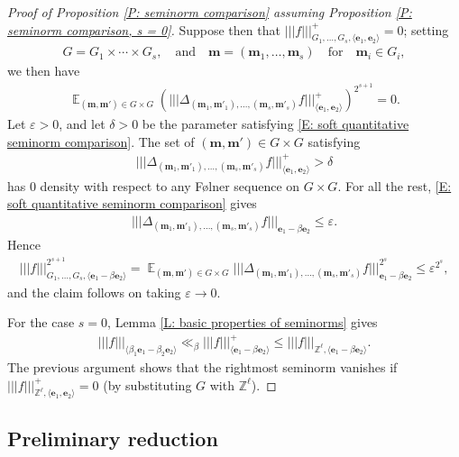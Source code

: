 \documentclass[11pt]{amsart}
\theoremstyle{definition}
\DeclareMathOperator*{\E}{\mathbb{E}}
\newcommand{\Z}{{\mathbb Z}}
\newcommand{\bm}{{\mathbf{m}}}
\newcommand{\be}{{\mathbf{e}}}
\newcommand{\veps}{\varepsilon}
\newcommand{\nnorm}[1]{\lvert\!|\!| #1|\!|\!\rvert}
\newcommand{\1}{{\mathbf{1}}}
\newcommand{\brac}[1]{\mathopen{}\left( #1 \mathclose{}\right)}
\begin{document}
\begin{proof}[Proof of Proposition \ref{P: seminorm comparison} assuming Proposition \ref{P: seminorm comparison, s = 0}]
Suppose then that $\nnorm{f}_{G_1, \ldots, G_s, \langle\be_1, \be_2\rangle}^+=0$; setting
\begin{align*}
 G = G_1\times \cdots\times G_{s},\quad \textrm{and} \quad\bm = (\bm_1, \ldots, \bm_{s})\quad \textrm{for} \quad\bm_i\in G_i,   
\end{align*}
we then have
\begin{align*}
    \E_{(\bm, \bm')\in G\times G}\brac{\nnorm{\Delta_{(\bm_1, \bm'_1), \ldots, (\bm_{s}, \bm'_{s})}f}^+_{\langle \be_1, \be_2\rangle}}^{2^{s+1}} =0.
\end{align*}
Let $\veps>0$, and let $\delta>0$ be the parameter satisfying \eqref{E: soft quantitative seminorm comparison}. The set of $(\bm, \bm')\in G\times G$ satisfying
\begin{align*}
    \nnorm{\Delta_{(\bm_1, \bm'_1), \ldots, (\bm_{s}, \bm'_{s})}f}^+_{\langle \be_1, \be_2\rangle}> \delta
\end{align*}
has 0 density with respect to any F\o lner sequence on $G\times G$. 
For all the rest, \eqref{E: soft quantitative seminorm comparison} gives
\begin{align*}
    \nnorm{\Delta_{(\bm_1, \bm'_1), \ldots, (\bm_{s}, \bm'_{s})}f}_{\be_1 -\beta\be_2}\leq \veps.
\end{align*}
Hence
\begin{align*}
    \nnorm{f}_{G_1, \ldots, G_s, \langle\be_1 - \beta \be_2\rangle}^{2^{s+1}} = \E_{(\bm, \bm')\in G\times G}\nnorm{\Delta_{(\bm_1, \bm'_1), \ldots, (\bm_{s}, \bm'_{s})}f}_{\be_1 -\beta\be_2}^{2^{s}} \leq\veps^{2^{s}},
\end{align*}
and the claim follows on taking $\veps\to 0$.

For the case $s=0$, Lemma \ref{L: basic properties of seminorms} gives
\begin{align*}
    \nnorm{f}_{\langle\beta_1 \be_1 - \beta_2 \be_2\rangle}\ll_{\beta} \nnorm{f}^+_{\langle \be_1 - \beta \be_2\rangle}\leq \nnorm{f}_{\Z^\ell, \langle \be_1 - \beta \be_2\rangle}.
\end{align*}
The previous argument shows that the rightmost seminorm vanishes if $\nnorm{f}_{\Z^\ell, \langle\be_1, \be_2\rangle}^+ = 0$ (by substituting $G$ with $\Z^{\ell}$).
\end{proof}


\subsection{Preliminary reduction}\label{SS: preliminary reduction}
\end{document}
